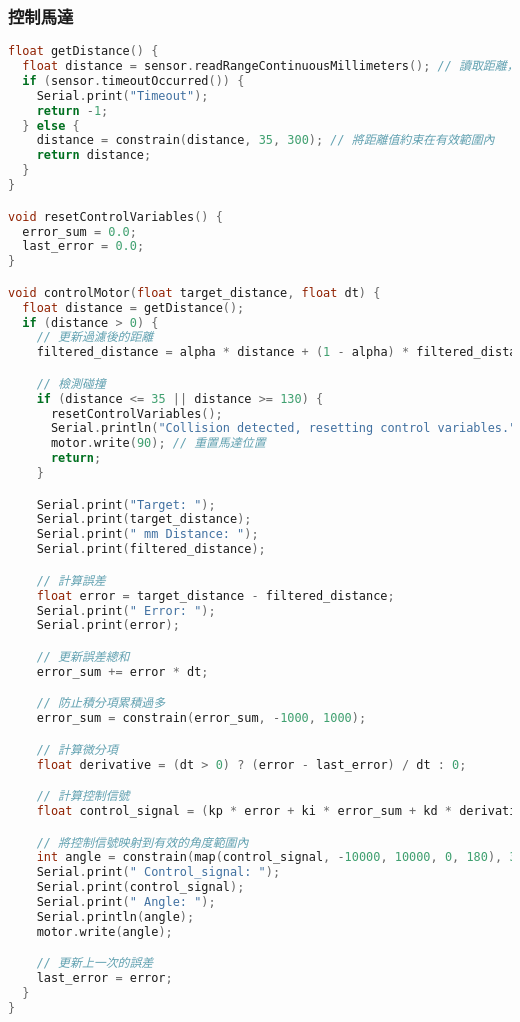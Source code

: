 \subsubsection{控制馬達}
\begin{lstlisting}[language=C]
float getDistance() {
  float distance = sensor.readRangeContinuousMillimeters(); // 讀取距離，單位毫米
  if (sensor.timeoutOccurred()) {
    Serial.print("Timeout");
    return -1;
  } else {
    distance = constrain(distance, 35, 300); // 將距離值約束在有效範圍內
    return distance;
  }
}

void resetControlVariables() {
  error_sum = 0.0;
  last_error = 0.0;
}

void controlMotor(float target_distance, float dt) {
  float distance = getDistance();
  if (distance > 0) {
    // 更新過濾後的距離
    filtered_distance = alpha * distance + (1 - alpha) * filtered_distance;

    // 檢測碰撞
    if (distance <= 35 || distance >= 130) {
      resetControlVariables();
      Serial.println("Collision detected, resetting control variables.");
      motor.write(90); // 重置馬達位置
      return;
    }

    Serial.print("Target: ");
    Serial.print(target_distance);
    Serial.print(" mm Distance: ");
    Serial.print(filtered_distance);

    // 計算誤差
    float error = target_distance - filtered_distance;
    Serial.print(" Error: ");
    Serial.print(error);

    // 更新誤差總和
    error_sum += error * dt;

    // 防止積分項累積過多
    error_sum = constrain(error_sum, -1000, 1000);

    // 計算微分項
    float derivative = (dt > 0) ? (error - last_error) / dt : 0;

    // 計算控制信號
    float control_signal = (kp * error + ki * error_sum + kd * derivative);

    // 將控制信號映射到有效的角度範圍內
    int angle = constrain(map(control_signal, -10000, 10000, 0, 180), 36 , 144);
    Serial.print(" Control_signal: ");
    Serial.print(control_signal);
    Serial.print(" Angle: ");
    Serial.println(angle);
    motor.write(angle);

    // 更新上一次的誤差
    last_error = error;
  }
}
\end{lstlisting}


